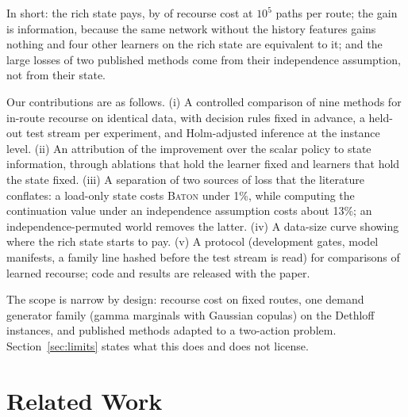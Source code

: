 \documentclass[trsc,dblanonrev]{informs4}
\newcommand{\Baton}{\textsc{Baton}}
\begin{document}
In short: the rich state pays, by \APrim{} of recourse cost at $10^5$ paths
per route; the gain is information, because the same network without the
history features gains nothing and four other learners on the rich state are
equivalent to it; and the large losses of two published methods come from
their independence assumption, not from their state.

Our contributions are as follows. (i) A controlled comparison of nine methods
for in-route recourse on identical data, with decision rules fixed in advance,
a held-out test stream per experiment, and Holm-adjusted inference at the
instance level. (ii) An attribution of the improvement over the scalar policy
to state information, through ablations that hold the learner fixed and
learners that hold the state fixed. (iii) A separation of two sources of loss
that the literature conflates: a load-only state costs \Baton{} under 1\%,
while computing the continuation value under an independence assumption costs
about 13\%; an independence-permuted world removes the latter. (iv) A
data-size curve showing where the rich state starts to pay. (v) A protocol
(development gates, model manifests, a family line hashed before the test
stream is read) for comparisons of learned recourse; code and results are
released with the paper.

The scope is narrow by design: recourse cost on fixed routes, one demand
generator family (gamma marginals with Gaussian copulas) on the Dethloff
instances, and published methods adapted to a two-action problem.
Section~\ref{sec:limits} states what this does and does not license.

\section{Related Work}\label{sec:related}
\end{document}
